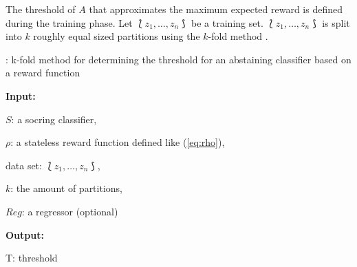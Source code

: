 \documentclass[twoside,11pt]{article}
\def\ds{\Lbag z_1,\dots,z_n \Rbag}
\begin{document}
The threshold of $A$ that approximates the maximum expected
reward is defined during the training phase.
Let $\ds$ be a training set.
$\ds$ is split into $k$ roughly equal sized partitions
using the $k$-fold method \citep[see][Chapter 7.10;
Algorithm~\ref{alg:method}, line 2]{hastie_et_al_2009}.

\begin{algorithm}
  \caption{: k-fold method for determining the threshold
             for an abstaining classifier based on a
             reward function}
  \label{alg:method}

  \textbf{Input:}

  \quad $S$: a socring classifier,

  \quad $\rho$: a stateless reward function defined like
        (\ref{eq:rho}),

  \quad data set: $\ds$,

  \quad $k$: the amount of partitions,

  \quad $Reg$: a regressor (optional)

  \textbf{Output:}

  \quad T: threshold

  \begin{algorithmic}[1]
      \ENDFOR
    \ENDFOR
    \ENDIF
  \end{algorithmic}
\end{algorithm}
\end{document}

